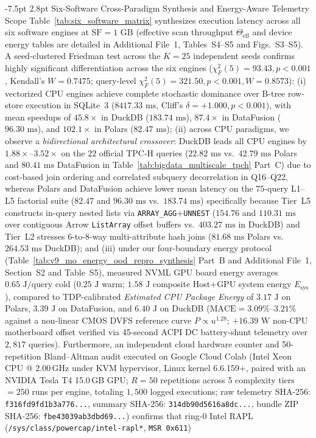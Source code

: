 \documentclass[10pt,a4paper]{article}
\makeatletter
\renewcommand\subsection{\@startsection{subsection}{2}{\z@}%
  {-7.5pt \@plus -2pt \@minus -1pt}%
  {2.8pt \@plus 1pt}%
  {\normalfont\normalsize\bfseries}}
\makeatother
\begin{document}
\subsection{Six-Software Cross-Paradigm Synthesis and Energy-Aware Telemetry Scope}
Table~\ref{tab:six_software_matrix} synthesizes execution latency across all six software engines at $\text{SF}=1\text{ GB}$ (effective scan throughput $\Theta_{\text{eff}}$ and device energy tables are detailed in Additional File~1, Tables~S4--S5 and Figs.~S3--S5). A seed-clustered Friedman test across the $K=25$ independent seeds confirms highly significant differentiation across the six engines ($\chi^2_F(5) = 93.43, p < 0.001$, Kendall's $W = 0.7475$; query-level $\chi^2_F(5) = 321.50, p < 0.001, W = 0.8573$): (i) vectorized CPU engines achieve complete stochastic dominance over B-tree row-store execution in SQLite~3 ($8417.33\text{ ms}$, Cliff's $\delta = +1.000, p < 0.001$), with mean speedups of $45.8\times$ in DuckDB ($183.74\text{ ms}$), $87.4\times$ in DataFusion ($96.30\text{ ms}$), and $102.1\times$ in Polars ($82.47\text{ ms}$); (ii) across CPU paradigms, we observe a \emph{bidirectional architectural crossover}: DuckDB leads all CPU engines by $1.88\times\text{--}3.52\times$ on the $22$ official TPC-H queries ($22.82\text{ ms}$ vs.\ $42.79\text{ ms}$ Polars and $80.41\text{ ms}$ DataFusion in Table~\ref{tab:bigdata_multiscale_tpch} Part~C) due to cost-based join ordering and correlated subquery decorrelation in Q16--Q22, whereas Polars and DataFusion achieve lower mean latency on the $75$-query L1--L5 factorial suite ($82.47$ and $96.30\text{ ms}$ vs.\ $183.74\text{ ms}$) specifically because Tier~L5 constructs in-query nested lists via \texttt{ARRAY\_AGG}+\texttt{UNNEST} ($154.76$ and $110.31\text{ ms}$ over contiguous Arrow \texttt{ListArray} offset buffers vs.\ $403.27\text{ ms}$ in DuckDB) and Tier~L2 stresses 6-to-8-way multi-attribute hash joins ($81.68\text{ ms}$ Polars vs.\ $264.53\text{ ms}$ DuckDB); and (iii) under our four-boundary energy protocol (Table~\ref{tab:v9_mo_energy_ood_repro_synthesis} Part~B and Additional File~1, Section~S2 and Table~S5), measured NVML GPU board energy averages $0.65\text{ J/query}$ cold ($0.25\text{ J}$ warm; $1.58\text{ J}$ composite Host+GPU system energy $E_{\text{sys}}$), compared to TDP-calibrated \emph{Estimated CPU Package Energy} of $3.17\text{ J}$ on Polars, $3.39\text{ J}$ on DataFusion, and $6.40\text{ J}$ on DuckDB ($\text{MACE}=3.09\%\text{--}3.21\%$ against a non-linear CMOS DVFS reference curve $P\propto u^{1.28}$; $+16.39\text{ W}$ non-CPU motherboard offset verified via 45-second ACPI DC battery-shunt telemetry over $2{,}817$ queries). Furthermore, an independent cloud hardware counter and 50-repetition Bland--Altman audit executed on Google Cloud Colab (Intel Xeon CPU @ 2.00\,GHz under KVM hypervisor, Linux kernel 6.6.159+, paired with an NVIDIA Tesla T4 15.0\,GB GPU; $R=50$ repetitions across 5 complexity tiers $= 250$ runs per engine, totaling $1{,}500$ logged executions; raw telemetry SHA-256: \texttt{f316fd9fd1b3a776...}, summary SHA-256: \texttt{314db90d5616a8dc...}, bundle ZIP SHA-256: \texttt{fbe43039ab3dbd69...}) confirms that ring-0 Intel RAPL (\texttt{/sys/class/powercap/intel-rapl*}, \texttt{MSR 0x611}) 
\end{document}

